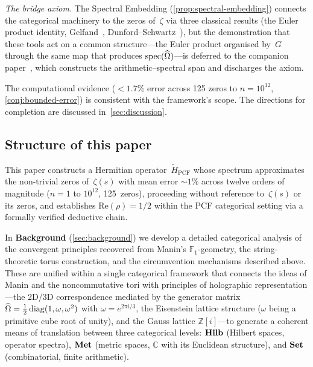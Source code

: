 \emph{The bridge axiom.}  The Spectral Embedding
(\cref{prop:spectral-embedding}) connects the categorical
machinery to the zeros of~$\zeta$ via three classical results
(the Euler product identity, Gelfand~\cite{gelfand41},
Dunford--Schwartz~\cite{dunford58}), but the demonstration that
these tools act on a common structure---the Euler product organised
by~$G$ through the same map that produces
$\mathrm{spec}(\widehat{\Omega})$---is deferred to the companion
paper~\cite{gonzalez26}, which constructs the arithmetic--spectral
span and discharges the axiom.


The computational evidence (${<}1.7\%$ error across 125 zeros to
$n = 10^{12}$, \cref{conj:bounded-error}) is consistent
with the framework's scope.  The directions for
completion are discussed in~\cref{sec:discussion}.

\subsection{Structure of this paper}\label{ssec:overview}

This paper constructs a Hermitian operator~$\tilde{H}_{\mathrm{PCF}}$
whose spectrum approximates the non-trivial zeros of~$\zeta(s)$ with
mean error ${\sim}1\%$ across twelve orders of magnitude ($n = 1$ to $10^{12}$, 125~zeros), proceeding without
reference to~$\zeta(s)$ or its zeros, and establishes
$\mathrm{Re}(\rho) = 1/2$ within the PCF categorical setting via a
formally verified deductive chain.

In \textbf{Background} (\cref{sec:background}) we develop a detailed
categorical analysis of the convergent principles recovered from
Manin's $\mathbb{F}_1$-geometry, the string-theoretic torus
construction, and the circumvention mechanisms described above.  These
are unified within a single categorical framework that connects the
ideas of Manin and the noncommutative tori with principles of
holographic representation---the 2D/3D correspondence mediated by the
generator matrix
$\widehat{\Omega} = \tfrac{1}{2}\,\mathrm{diag}(1,\omega,\omega^2)$ with
$\omega = e^{2\pi i/3}$, the Eisenstein lattice structure ($\omega$
being a primitive cube root of unity), and the Gauss lattice
$\mathbb{Z}[i]$---to generate a coherent means of translation between
three categorical levels: $\mathbf{Hilb}$ (Hilbert spaces, operator spectra),
$\mathbf{Met}$ (metric spaces, $\mathbb{C}$ with its Euclidean structure), and
$\mathbf{Set}$ (combinatorial, finite arithmetic).

